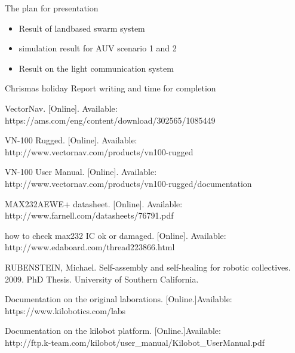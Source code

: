 \documentclass[cleardoublepage=plain]{scrartcl}
\begin{document}
The plan for presentation
\begin{itemize}
\item Result of landbased swarm system
\item simulation result for AUV scenario 1 and 2
\item Result on the light communication system
\end{itemize}

Chrismas holiday
Report writing and time for completion












\newpage






\newpage
\begin{thebibliography}{1}

VectorNav. [Online]. Available: \\
https://ams.com/eng/content/download/302565/1085449

VN-100 Rugged. [Online]. Available: \\
http://www.vectornav.com/products/vn100-rugged

VN-100 User Manual. [Online]. Available: \\
http://www.vectornav.com/products/vn100-rugged/documentation

MAX232AEWE+ datasheet. [Online]. Available: \\
http://www.farnell.com/datasheets/76791.pdf

how to check max232 IC ok or damaged. [Online]. Available: \\
http://www.edaboard.com/thread223866.html

RUBENSTEIN, Michael. Self-assembly and self-healing for robotic collectives. 2009. PhD Thesis. University of Southern California.

Documentation on the original laborations. [Online.]Available: \\
https://www.kilobotics.com/labs


Documentation on the kilobot platform. [Online.]Available: \\
http://ftp.k-team.com/kilobot/user\_manual/Kilobot\_UserManual.pdf








\end{thebibliography}
\end{document}
